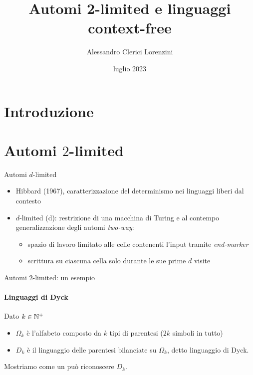 \documentclass{beamer}
\title{Automi 2-limited e linguaggi context-free}
\author{Alessandro Clerici Lorenzini}
\date{luglio 2023}
\institute{Seminario per l'esame di Teoria dei Linguaggi @ Unimi}
\begin{document}
\maketitle


\section{Introduzione}


\section{Automi \texorpdfstring{$2$}{2}-limited}
\begin{frame}{Automi $d$-limited}
	\begin{itemize}
		\item Hibbard (1967), caratterizzazione del determinismo nei linguaggi liberi dal contesto
		\item $d$-limited (\la d): restrizione di una macchina di Turing e al contempo generalizzazione degli automi \emph{two-way}:
		      \begin{itemize}
			      \item spazio di lavoro limitato alle celle contenenti l'input tramite \emph{end-marker}
			      \item scrittura su ciascuna cella solo durante le sue prime $d$ visite
		      \end{itemize}
	\end{itemize}

	\vfill
	\begin{figure}
		\centering
		
	\end{figure}
\end{frame}

\begin{frame}{Automi $2$-limited: un esempio}
	\framesubtitle{Linguaggi di Dyck}
	Dato $k\in\mathbb N^+$
	\begin{itemize}
		\item $\Omega_k$ è l'alfabeto composto da $k$ tipi di parentesi ($2k$ simboli in tutto)
		\item $D_k$ è il linguaggio delle parentesi bilanciate su $\Omega_k$, detto linguaggio di Dyck.
	\end{itemize}
	\vspace{1cm}
	Mostriamo come un  può riconoscere $D_k$.
\end{frame}
\end{document}
